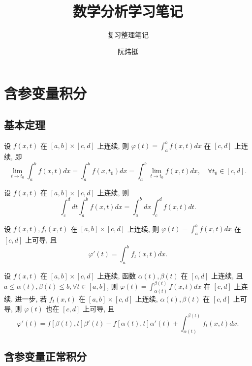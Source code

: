\documentclass[lang=cn,newtx,10pt,scheme=chinese]{elegantbook}
\title{数学分析学习笔记}
\subtitle{复习整理笔记}
\author{阮炜挺}
\institute{宁波大学数学与统计学院}
\date{}
\begin{document}
\maketitle
\frontmatter

\tableofcontents

\mainmatter

\chapter{含参变量积分}

\section{基本定理}

\begin{theorem}[连续性]
设 $f(x,t)$ 在 $[a,b] \times [c,d]$ 上连续, 则 $\varphi(t) = \int_{a}^{b} f(x,t) dx$ 在 $[c,d]$ 上连续, 即
$$ \lim\limits_{t \to t_0} \int_{a}^{b} f(x,t) dx = \int_{a}^{b} f(x, t_0) dx = \int_{a}^{b} \lim\limits_{t \to t_0} f(x,t) dx, \quad \forall t_0 \in [c,d]. $$
\end{theorem}

\begin{theorem}[交换积分次序]
设 $f(x,t)$ 在 $[a,b] \times [c,d]$ 上连续, 则
$$ \int_{c}^{d} dt \int_{a}^{b} f(x,t) dx = \int_{a}^{b} dx \int_{c}^{d} f(x,t) dt. $$
\end{theorem}

\begin{theorem}[可微性]
设 $f(x,t), f_t(x,t)$ 在 $[a,b] \times [c,d]$ 上连续, 则 $\varphi(t) = \int_{a}^{b} f(x,t) dx$ 在 $[c,d]$ 上可导, 且
$$ \varphi'(t) = \int_{a}^{b} f_t(x,t) dx. $$
\end{theorem}

\begin{theorem}[一般情形的连续性与可微性]
设 $f(x,t)$ 在 $[a,b] \times [c,d]$ 上连续, 函数 $\alpha(t), \beta(t)$ 在 $[c,d]$ 上连续, 且 $a \le \alpha(t), \beta(t) \le b, \forall t \in [a,b]$, 则 $\varphi(t) = \int_{\alpha(t)}^{\beta(t)} f(x,t) dx$ 在 $[c,d]$ 上连续. 进一步, 若 $f_t(x,t)$ 在 $[a,b] \times [c,d]$ 上连续, $\alpha(t), \beta(t)$ 在 $[c,d]$ 上可导, 则 $\varphi(t)$ 也在 $[c,d]$ 上可导, 且
$$ \varphi'(t) = f[\beta(t),t]\beta'(t) - f[\alpha(t),t]\alpha'(t) + \int_{\alpha(t)}^{\beta(t)} f_t(x,t) dx. $$
\end{theorem}

\section{含参变量正常积分}
\end{document}
